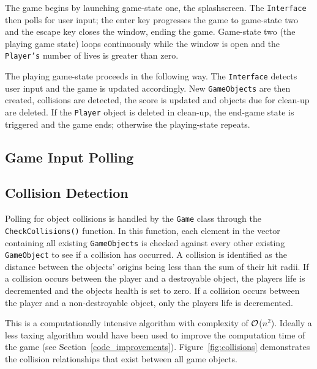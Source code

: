 \documentclass[10pt,twocolumn]{witseiepaper}
\begin{document}
The game begins by launching game-state one, the splashscreen. The \texttt{Interface} then polls for user input; the enter key progresses the game to game-state two and the escape key closes the window, ending the game. Game-state two (the playing game state) loops continuously while the window is open and the \texttt{Player's} number of lives is greater than zero. 

The playing game-state proceeds in the following way. The \texttt{Interface} detects user input and the game is updated accordingly. New \texttt{GameObjects} are then created, collisions are detected, the score is updated and objects due for clean-up are deleted. If the \texttt{Player} object is deleted in clean-up, the end-game state is triggered and the game ends; otherwise the playing-state repeats.

\subsection{Game Input Polling}



\subsection{Collision Detection}

Polling for object collisions is handled by the \texttt{Game} class through the \texttt{CheckCollisions()} function. In this function, each element in the vector containing all existing \texttt{GameObjects} is checked against every other existing \texttt{GameObject} to see if a collision has occurred. A collision is identified as the distance between the objects' origins being less than the sum of their hit radii. If a collision occurs between the player and a destroyable object, the players life is decremented and the objects health is set to zero. If a collision occurs between the player and a non-destroyable object, only the players life is decremented.

This is a computationally intensive algorithm with complexity of $\cal{O}$($n^{2}$). Ideally a less taxing algorithm would have been used to improve the computation time of the game (see Section~\ref{code_improvements}). Figure~\ref{fig:collisions} demonstrates the collision relationships that exist between all game objects.
\end{document}
